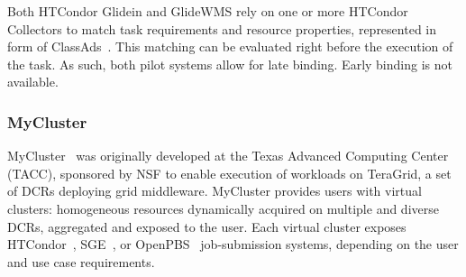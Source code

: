 \documentclass{sig-alternate}
\begin{document}

Both HTCondor Glidein and GlideWMS rely on one or more HTCondor Collectors to
match task requirements and resource properties, represented in form of
ClassAds~\cite{classad_url}. This matching can be evaluated right before the
execution of the task. As such, both pilot systems allow for late binding. Early
binding is not available.


%
\subsubsection{MyCluster}\label{sec:mycluster}

MyCluster~\cite{walker2007personal,mycluster_url} was originally developed at
the Texas Advanced Computing Center (TACC), sponsored by NSF to enable execution
of workloads on TeraGrid, a set of DCRs deploying grid middleware. MyCluster
provides users with virtual clusters: homogeneous resources dynamically acquired
on multiple and diverse DCRs, aggregated and exposed to the user. Each virtual
cluster exposes HTCondor~\cite{thain2005}, SGE~\cite{chase2003dynamic}, or
OpenPBS~\cite{openpbs_url} job-submission systems, depending on the user and use
case requirements.
\end{document}
